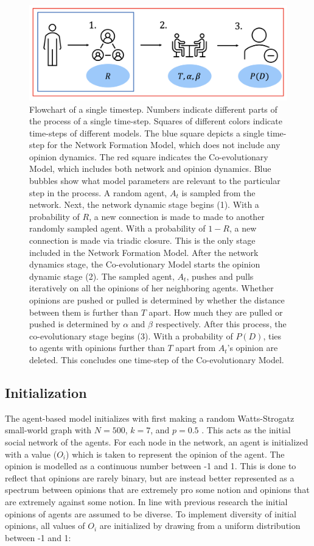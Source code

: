 \documentclass{article}
\begin{document}
\begin{figure}[H]
  \centering
  \includegraphics[width=.9\linewidth]{../plots/schematics/model_representation.png}
\caption{Flowchart of a single timestep. Numbers indicate different parts of the process of a single time-step. Squares of different colors indicate time-steps of different models. The blue square depicts a single time-step for the Network Formation Model, which does not include any opinion dynamics. The red square indicates the Co-evolutionary Model, which includes both network and opinion dynamics. Blue bubbles show what model parameters are relevant to the particular step in the process. A random agent, $A_t$ is sampled from the network. Next, the network dynamic stage begins (1). With a probability of $R$, a new connection is made to made to another randomly sampled agent. With a probability of $1-R$, a new connection is made via triadic closure. This is the only stage included in the Network Formation Model. After the network dynamics stage, the Co-evolutionary Model starts the opinion dynamic stage (2). The sampled agent, $A_t$, pushes and pulls iteratively on all the opinions of her neighboring agents. Whether opinions are pushed or pulled is determined by whether the distance between them is further than $T$ apart. How much they are pulled or pushed is determined by $\alpha$ and $\beta$ respectively. After this process, the co-evolutionary stage begins (3). With a probability of $P(D)$, ties to agents with opinions further than $T$ apart from $A_t$'s opinion are deleted. This concludes one time-step of the Co-evolutionary Model.}
\label{fig:flowchart}
\end{figure}


\subsection{Initialization}
The agent-based model initializes with first making a random Watts-Strogatz small-world graph
with $N=500$, $k=7$, and $p=0.5$ \cite{watts_collective_1998}. This acts as the initial social network of the agents. For each node in the network,
an agent is initialized with a value ($O_i$) which is taken to represent the opinion of the agent. The opinion is modelled as a continuous number between -1 and 1. 
This is done to reflect that opinions are rarely binary, but are instead better represented as a spectrum between opinions that are extremely pro some notion and opinions that are extremely against some notion.
In line with previous research the initial opinions of agents are assumed to be diverse. To implement diversity of initial opinions, all values of $O_i$ are initialized by drawing from a uniform distribution between -1 and 1: 
\end{document}
